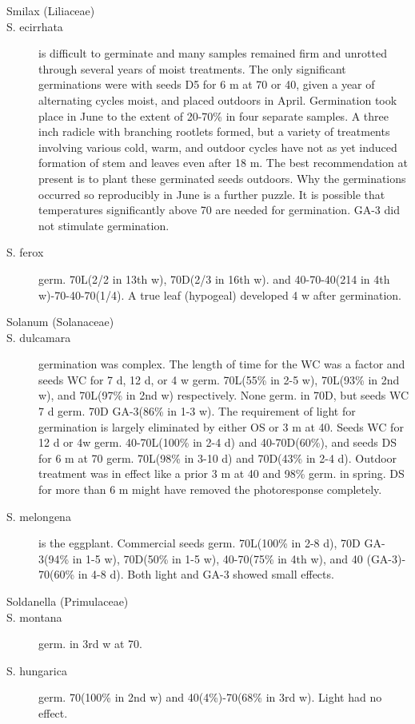 \begin{description}
\item[Smilax (Liliaceae)]
\item[S. ecirrhata] is difficult to germinate and many samples remained firm and
unrotted through several years of moist treatments. The only significant germinations
were with seeds D5 for 6 m at 70 or 40, given a year of alternating cycles moist, and
placed outdoors in April. Germination took place in June to the extent of 20-70\% in
four separate samples. A three inch radicle with branching rootlets formed, but a
variety of treatments involving various cold, warm, and outdoor cycles have not as yet
induced formation of stem and leaves even after 18 m. The best recommendation at
present is to plant these germinated seeds outdoors. Why the germinations occurred
so reproducibly in June is a further puzzle. It is possible that temperatures significantly
above 70 are needed for germination. GA-3 did not stimulate germination.

\item[S. ferox] germ. 70L(2/2 in 13th w), 70D(2/3 in 16th w). and 40-70-40(214 in 4th
w)-70-40-70(1/4). A true leaf (hypogeal) developed 4 w after germination.

\item[Solanum (Solanaceae)]
\item[S. dulcamara] germination was complex. The length of time for the WC was a
factor and seeds WC for 7 d, 12 d, or 4 w germ. 70L(55\% in 2-5 w), 70L(93\% in 2nd w),
and 70L(97\% in 2nd w) respectively. None germ. in 70D, but seeds WC 7 d germ.
70D GA-3(86\% in 1-3 w). The requirement of light for germination is largely eliminated
by either OS or 3 m at 40. Seeds WC for 12 d or 4w germ. 40-70L(100\% in 2-4 d) and
40-70D(60\%), and seeds DS for 6 m at 70 germ. 70L(98\% in 3-10 d) and 70D(43\% in
2-4 d). Outdoor treatment was in effect like a prior 3 m at 40 and 98\% germ. in spring.
DS for more than 6 m might have removed the photoresponse completely.
\item[S. melongena] is the eggplant. Commercial seeds germ. 70L(100\% in 2-8 d),
70D GA-3(94\% in 1-5 w), 70D(50\% in 1-5 w), 40-70(75\% in 4th w), and 40 (GA-3)-
70(60\% in 4-8 d). Both light and GA-3 showed small effects.

\item[Soldanella (Primulaceae)]
\item[S. montana] germ. in 3rd w at 70.
\item[S. hungarica] germ. 70(100\% in 2nd w) and 40(4\%)-70(68\% in 3rd w). Light
had no effect.


\end{description}
